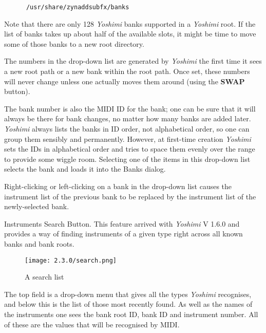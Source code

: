    \begin{verbatim}
      /usr/share/zynaddsubfx/banks
   \end{verbatim}

   Note that there are only 128 \textsl{Yoshimi} banks
   supported in a \textsl{Yoshimi} root.
   If the list of banks takes up about half of the available slots, it might be
   time to move some of those banks to a new root directory.

   The numbers in the drop-down list are generated by \textsl{Yoshimi} the
   first time it sees a new root path or a new bank within the root path.
   Once set, these numbers will never change unless one actually moves them
   around (using the \textbf{SWAP} button).

   The bank number is also the MIDI ID for the bank;
   one can be sure that it will always
   be there for bank changes, no matter how many banks are added later.
   \textsl{Yoshimi} always lists the banks in ID order, not alphabetical
   order, so one can group them sensibly and permanently.
   However, at first-time creation \textsl{Yoshimi} sets the IDs in
   alphabetical order and tries to space them evenly over the range to
   provide some wiggle room.
   Selecting one of the items in this drop-down list selects the bank and
   loads it into the Banks dialog.

   Right-clicking or left-clicking on a bank in the drop-down list
   causes the instrument list of the previous bank to be replaced by the
   instrument list of the newly-selected bank.

   Instruments Search Button.
   This feature arrived with \textsl{Yoshimi} V 1.6.0 and provides a
   way of finding instruments of a given type right across all known banks and
   bank roots.


\begin{figure}[H]
   \centering
   \texttt{[image: 2.3.0/search.png]}
   \caption[A search list List]{A search list}
   \label{fig:bank_search}
\end{figure}
   The top field is a drop-down menu that gives all the types
   \textsl{Yoshimi} recognises, and below this is the list of those
   most recently found. As well as the names of the instruments
   one sees the bank root ID, bank ID and instrument number. All of these
   are the values that will be recognised by MIDI.

